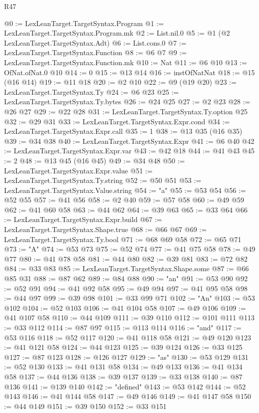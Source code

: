 \begin{lexlean}{R47}
\begin{coremodule}
@0 := LexLeanTarget.TargetSyntax.Program
@1 := LexLeanTarget.TargetSyntax.Program.mk
@2 := List.nil.{0}
@5 := @1 (@2 LexLeanTarget.TargetSyntax.Adt)
@6 := List.cons.{0}
@7 := LexLeanTarget.TargetSyntax.Function
@8 := @6 @7
@9 := LexLeanTarget.TargetSyntax.Function.mk
@10 := Nat
@11 := @6 @10
@13 := OfNat.ofNat.{0} @10
@14 := 0
@15 := @13 @14
@16 := instOfNatNat
@18 := @15 (@16 @14)
@19 := @11 @18
@20 := @2 @10
@22 := @9 (@19 @20)
@23 := LexLeanTarget.TargetSyntax.Ty
@24 := @6 @23
@25 := LexLeanTarget.TargetSyntax.Ty.bytes
@26 := @24 @25
@27 := @2 @23
@28 := @26 @27
@29 := @22 @28
@31 := LexLeanTarget.TargetSyntax.Ty.option @25
@32 := @29 @31
@33 := LexLeanTarget.TargetSyntax.Expr.cond
@34 := LexLeanTarget.TargetSyntax.Expr.call
@35 := 1
@38 := @13 @35 (@16 @35)
@39 := @34 @38
@40 := LexLeanTarget.TargetSyntax.Expr
@41 := @6 @40
@42 := LexLeanTarget.TargetSyntax.Expr.var
@43 := @42 @18
@44 := @41 @43
@45 := 2
@48 := @13 @45 (@16 @45)
@49 := @34 @48
@50 := LexLeanTarget.TargetSyntax.Expr.value
@51 := LexLeanTarget.TargetSyntax.Ty.string
@52 := @50 @51
@53 := LexLeanTarget.TargetSyntax.Value.string
@54 := "a"
@55 := @53 @54
@56 := @52 @55
@57 := @41 @56
@58 := @2 @40
@59 := @57 @58
@60 := @49 @59
@62 := @41 @60 @58
@63 := @44 @62
@64 := @39 @63
@65 := @33 @64
@66 := LexLeanTarget.TargetSyntax.Expr.build
@67 := LexLeanTarget.TargetSyntax.Shape.true
@68 := @66 @67
@69 := LexLeanTarget.TargetSyntax.Ty.bool
@71 := @68 @69 @58
@72 := @65 @71
@73 := "A"
@74 := @53 @73
@75 := @52 @74
@77 := @41 @75 @58
@78 := @49 @77
@80 := @41 @78 @58
@81 := @44 @80
@82 := @39 @81
@83 := @72 @82
@84 := @33 @83
@85 := LexLeanTarget.TargetSyntax.Shape.some
@87 := @66 @85 @31
@88 := @87 @62
@89 := @84 @88
@90 := "an"
@91 := @53 @90
@92 := @52 @91
@94 := @41 @92 @58
@95 := @49 @94
@97 := @41 @95 @58
@98 := @44 @97
@99 := @39 @98
@101 := @33 @99 @71
@102 := "An"
@103 := @53 @102
@104 := @52 @103
@106 := @41 @104 @58
@107 := @49 @106
@109 := @41 @107 @58
@110 := @44 @109
@111 := @39 @110
@112 := @101 @111
@113 := @33 @112
@114 := @87 @97
@115 := @113 @114
@116 := "and"
@117 := @53 @116
@118 := @52 @117
@120 := @41 @118 @58
@121 := @49 @120
@123 := @41 @121 @58
@124 := @44 @123
@125 := @39 @124
@126 := @33 @125
@127 := @87 @123
@128 := @126 @127
@129 := "as"
@130 := @53 @129
@131 := @52 @130
@133 := @41 @131 @58
@134 := @49 @133
@136 := @41 @134 @58
@137 := @44 @136
@138 := @39 @137
@139 := @33 @138
@140 := @87 @136
@141 := @139 @140
@142 := "defined"
@143 := @53 @142
@144 := @52 @143
@146 := @41 @144 @58
@147 := @49 @146
@149 := @41 @147 @58
@150 := @44 @149
@151 := @39 @150
@152 := @33 @151

\end{coremodule}
\end{lexlean}
